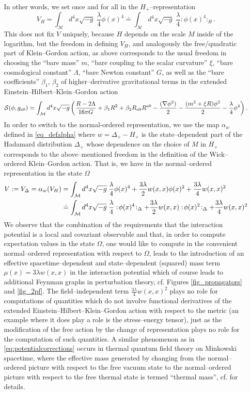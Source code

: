 \documentclass[a4paper,10pt,twoside]{article}
\numberwithin{equation}{section}
\newcounter{and}
\def\M{\mathcal{M}}
\newcommand{\wick}[1]{:\!{#1}\!:}
\theoremstyle{plain}
\theoremstyle{definition}
\begin{document}
In other words, we set once and for all in the $H_+$--representation 
$$
V_H=\int_\M d^4x \sqrt{-g} \; \frac{\lambda}{4} \phi(x)^4\doteq \int_\M d^4x \sqrt{-g} \; \frac{\lambda}{4} \wick{\phi(x)^4}_H.
$$
This does not fix $V$ uniquely, because $H$ depends on the scale $M$ inside of the logarithm, but the freedom in defining $V_H$, and analogously the free/quadratic part of Klein--Gordon action, as above corresponds to the usual freedom in choosing the ``bare mass'' $m$, ``bare coupling to the scalar curvature'' $\xi$, ``bare cosmological constant'' $\Lambda$, ``bare Newton constant'' $G$, as well as the ``bare coefficients'' $\beta_1$, $\beta_2$ of higher--derivative gravitational terms in the extended Einstein--Hilbert--Klein--Gordon action
$$
{\cal S}(\phi,g_{ab})=\int_\M d^4x \sqrt{-g}\left(\frac{R-2\Lambda}{16 \pi G}+\beta_1 R^2 + \beta_2 R_{ab}R^{ab}-\frac{(\nabla \phi^2)}{2}-\frac{(m^2+\xi R )\phi^2}{2}-\frac{\lambda}{4}\phi^4\right).
$$
In order to switch to the normal-ordered representation, we use the map $\alpha_{w}$ defined in \eqref{eq_defalpha} where $w=\Delta_+-H_+$ is the state--dependent part of the Hadamard distribution $\Delta_+$ whose dependence on the choice of $M$ in $H_+$ corresponds to the above--mentioned freedom in the definition of the Wick--ordered Klein--Gordon action. That is, we have in the normal--ordered representation in the state $\Omega$
\begin{align}\label{eq:potentialcorrections}
V:=V_\Delta=\alpha_w(V_H)&=\int_\M d^4x \sqrt{-g} \; \frac{\lambda}{4} \phi(x)^4 + \frac{3\lambda}{2}w(x,x)\phi(x)^2+\frac{3\lambda}{4} w(x,x)^2\\
&\doteq\int_\M d^4x \sqrt{-g} \; \frac{\lambda}{4} \wick{\phi(x)^4}_\Delta + \frac{3\lambda}{2}w(x,x)\wick{\phi(x)^2}_\Delta+\frac{3\lambda}{4} w(x,x)^2\notag
\end{align}
We observe that the combination of the requirements that the interaction potential is a local and covariant observable and that, in order to compute expectation values in the state $\Omega$, one would like to compute in the convenient normal--ordered representation with respect to $\Omega$, leads to the introduction of an effective spacetime--dependent and state--dependent (squared) mass term $\mu(x)=3\lambda w(x,x)$ in the interaction potential which of course leads to additional Feynman graphs in perturbation theory, cf. Figures \ref{fig_propagators} and \ref{fig_2pf}. The field--independent term $\frac{3\lambda}{4} w(x,x)^2$ plays no role for computations of quantities which do not involve functional derivatives of the extended Einstein--Hilbert--Klein--Gordon action with respect to the metric (an example where it does play a role is the stress--energy tensor), just as the modification of the free action by the change of representation plays no role for the computation of such quantities. A similar phenomenon as in \eqref{eq:potentialcorrections} occurs in thermal quantum field theory on Minkowski spacetime, where the effective mass generated by changing from the normal--ordered picture with respect to the free vacuum state to the normal--ordered picture with respect to the free thermal state is termed ``thermal mass'', cf. \cite[Section 2.3.2.]{Lindner:2013ila} for details.
\end{document}

